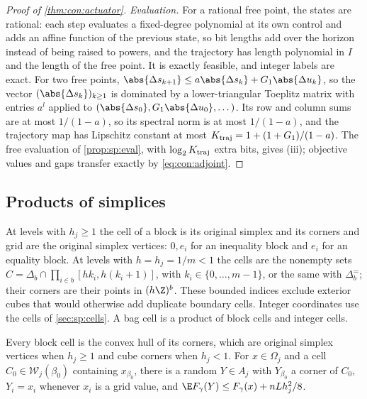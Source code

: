 \begin{proof}[Proof of \cref{thm:con:actuator}]
\emph{Evaluation.} For a rational free point, the states are rational: each
step evaluates a fixed-degree polynomial at its own control and adds an affine
function of the previous state, so bit lengths add over the horizon instead
of being raised to powers, and the trajectory has length polynomial in $I$
and the length of the free point. It is exactly feasible, and integer labels
are exact. For two free points, $\abs{\Delta s_{k+1}}\le a\abs{\Delta
s_k}+G_1\abs{\Delta u_k}$, so the vector $(\abs{\Delta s_k})_{k\ge1}$ is
dominated by a lower-triangular Toeplitz matrix with entries $a^l$ applied to
$(\abs{\Delta s_0},G_1\abs{\Delta u_0},\dots)$. Its row and column sums are at
most $1/(1-a)$, so its spectral norm is at most $1/(1-a)$, and the trajectory
map has Lipschitz constant at most $K_{\rm traj}=1+(1+G_1)/(1-a)$. The free
evaluation of \cref{prop:sp:eval}, with $\log_2K_{\rm traj}$ extra bits,
gives (iii); objective values and gaps transfer exactly by
\eqref{eq:con:adjoint}.
\end{proof}

\subsection{Products of simplices}\label{app:con:simplex}

At levels with $h_j\ge1$ the cell of a block is its original simplex and
its corners and grid are the original simplex vertices: $0,e_i$ for an
inequality block and $e_i$ for an equality block. At levels with
$h=h_j=1/m<1$ the cells are the nonempty sets
$C=\Delta_b\cap\prod_{i\in b}[hk_i,h(k_i+1)]$, with
$k_i\in\{0,\dots,m-1\}$, or the same with $\Delta^=_b$; their corners are
their points in $(h\Z)^b$. These bounded indices exclude exterior cubes
that would otherwise add duplicate boundary cells. Integer coordinates use
the cells of \cref{sec:sp:cells}. A bag cell is a product of block cells
and integer cells.

\begin{lemma}\label{lem:con:simplex-round}
Every block cell is the convex hull of its corners, which are original
simplex vertices when $h_j\ge1$ and cube corners when $h_j<1$.
For $x\in\Omega_j$ and a cell $C_0\in\mathcal W_j(\beta_0)$ containing
$x_{\beta_0}$, there is a random $Y\in A_j$ with $Y_{\beta_0}$ a corner of
$C_0$, $Y_i=x_i$ whenever $x_i$ is a grid value, and
$\E F_\gamma(Y)\le F_\gamma(x)+nLh_j^2/8$.
\end{lemma}

